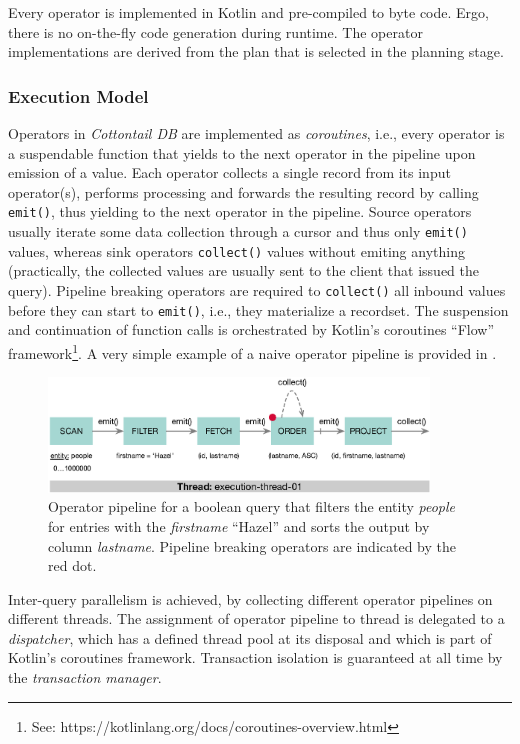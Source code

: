 Every operator is implemented in Kotlin and pre-compiled to byte code. Ergo, there is no on-the-fly code generation during runtime. The operator implementations are derived from the plan that is selected in the planning stage.

\subsubsection{Execution Model}

Operators in \emph{Cottontail DB} are implemented as \emph{coroutines}, i.e., every operator is a suspendable function that yields to the next operator in the pipeline upon emission of a value. Each operator collects a single record from its input operator(s), performs processing and forwards the resulting record by calling \texttt{emit()}, thus yielding to the next operator in the pipeline. Source operators usually iterate some data collection through a cursor and thus only \texttt{emit()} values, whereas sink operators \texttt{collect()} values without emiting anything (practically, the collected values are usually sent to the client that issued the query). Pipeline breaking operators are required to \texttt{collect()} all inbound values before they can start to \texttt{emit()}, i.e., they materialize a recordset. The suspension and continuation of function calls is orchestrated by Kotlin's coroutines ``Flow'' framework\footnote{See: https://kotlinlang.org/docs/coroutines-overview.html}. A very simple example of a naive operator pipeline is provided in .

\begin{figure}[bt]
    \centering
    \includegraphics[width=0.9\textwidth]{figures/execution-model-simple}
    \caption{Operator pipeline for a boolean query that filters the entity \emph{people} for entries with the \emph{firstname} ``Hazel'' and sorts the output by column \emph{lastname}. Pipeline breaking operators are indicated by the red dot.}
    \label{figure:cottontail_execution_model_simple}
\end{figure}

Inter-query parallelism is achieved, by collecting different operator pipelines on different threads. The assignment of operator pipeline to thread is delegated to a \emph{dispatcher}, which has a defined thread pool at its disposal and which is part of Kotlin's coroutines framework. Transaction isolation is guaranteed at all time by the \emph{transaction manager}.

